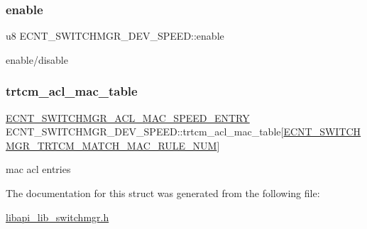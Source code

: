 \subsubsection{\texorpdfstring{enable}{enable}}
{\footnotesize\ttfamily u8 E\+C\+N\+T\+\_\+\+S\+W\+I\+T\+C\+H\+M\+G\+R\+\_\+\+D\+E\+V\+\_\+\+S\+P\+E\+E\+D\+::enable}

enable/disable \mbox{\label{structECNT__SWITCHMGR__DEV__SPEED_ac38251d75b5f97aa694db2f4e18f3227}} 
\subsubsection{\texorpdfstring{trtcm\+\_\+acl\+\_\+mac\+\_\+table}{trtcm\_acl\_mac\_table}}
{\footnotesize\ttfamily \hyperlink{structECNT__SWITCHMGR__ACL__MAC__SPEED__ENTRY}{E\+C\+N\+T\+\_\+\+S\+W\+I\+T\+C\+H\+M\+G\+R\+\_\+\+A\+C\+L\+\_\+\+M\+A\+C\+\_\+\+S\+P\+E\+E\+D\+\_\+\+E\+N\+T\+RY} E\+C\+N\+T\+\_\+\+S\+W\+I\+T\+C\+H\+M\+G\+R\+\_\+\+D\+E\+V\+\_\+\+S\+P\+E\+E\+D\+::trtcm\+\_\+acl\+\_\+mac\+\_\+table\mbox{[}\hyperlink{libapi__lib__switchmgr_8h_a3930ec373da9905ced88fe17677c6011}{E\+C\+N\+T\+\_\+\+S\+W\+I\+T\+C\+H\+M\+G\+R\+\_\+\+T\+R\+T\+C\+M\+\_\+\+M\+A\+T\+C\+H\+\_\+\+M\+A\+C\+\_\+\+R\+U\+L\+E\+\_\+\+N\+UM}\mbox{]}}

mac acl entries 

The documentation for this struct was generated from the following file\+:\begin{DoxyCompactItemize}
\item 
\hyperlink{libapi__lib__switchmgr_8h}{libapi\+\_\+lib\+\_\+switchmgr.\+h}\end{DoxyCompactItemize}
